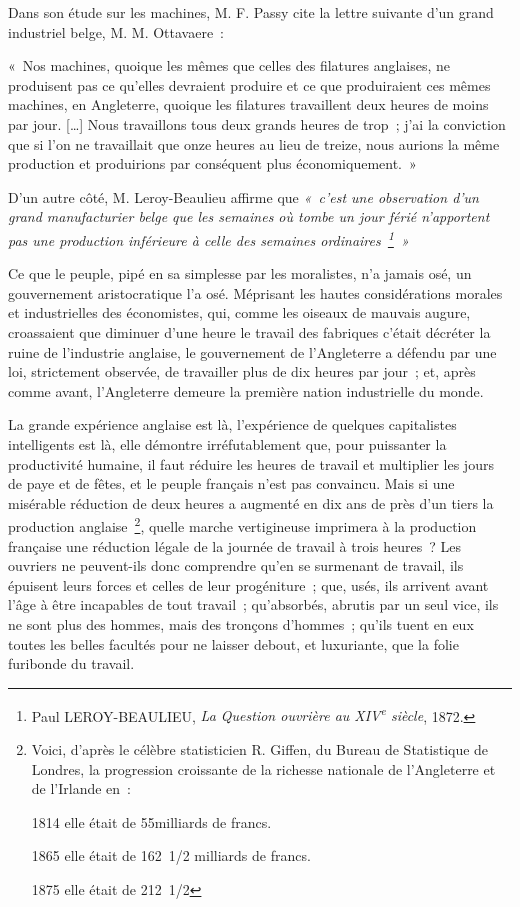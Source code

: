 \documentclass[french,twoside]{book} %
\newenvironment{quoteblock}%
  {\begin{quoting}}
  {\end{quoting}}
\newenvironment{quotebar}{%
    \def\FrameCommand{{\color{rubric!10!}\vrule width 0.5em} \hspace{0.9em}}%
    \def\OuterFrameSep{\itemsep} %
    \MakeFramed {\advance\hsize-\width \FrameRestore}
  }%
  {%
    \endMakeFramed
  }
\renewenvironment{quoteblock}%
  {%
    \savenotes
    \setstretch{0.9}
    \normalfont
    \begin{quotebar}
  }
  {%
    \end{quotebar}
    \spewnotes
  }
\begin{document}
\noindent Dans son étude sur les machines, M. F. Passy cite la lettre suivante d’un grand industriel belge, M. M. Ottavaere :\par

\begin{quoteblock}
 \noindent « Nos machines, quoique les mêmes que celles des filatures anglaises, ne produisent pas ce qu’elles devraient produire et ce que produiraient ces mêmes machines, en Angleterre, quoique les filatures travaillent deux heures de moins par jour. […] Nous travaillons tous deux grands heures de trop ; j’ai la conviction que si l’on ne travaillait que onze heures au lieu de treize, nous aurions la même production et produirions par conséquent plus économiquement. »
\end{quoteblock}

\noindent D’un autre côté, M. Leroy-Beaulieu affirme que \emph{« c’est une observation d’un grand manufacturier belge que les semaines où tombe un jour férié n’apportent pas une production inférieure à celle des semaines ordinaires \footnote{Paul LEROY-BEAULIEU, \emph{La Question ouvrière au XIV\textsuperscript{e} siècle}, 1872.} »}\par
Ce que le peuple, pipé en sa simplesse par les moralistes, n’a jamais osé, un gouvernement aristocratique l’a osé. Méprisant les hautes considérations morales et industrielles des économistes, qui, comme les oiseaux de mauvais augure, croassaient que diminuer d’une heure le travail des fabriques c’était décréter la ruine de l’industrie anglaise, le gouvernement de l’Angleterre a défendu par une loi, strictement observée, de travailler plus de dix heures par jour ; et, après comme avant, l’Angleterre demeure la première nation industrielle du monde.\par
La grande expérience anglaise est là, l’expérience de quelques capitalistes intelligents est là, elle démontre irréfutablement que, pour puissanter la productivité humaine, il faut réduire les heures de travail et multiplier les jours de paye et de fêtes, et le peuple français n’est pas convaincu. Mais si une misérable réduction de deux heures a augmenté en dix ans de près d’un tiers la production anglaise \footnote{ \noindent Voici, d’après le célèbre statisticien R. Giffen, du Bureau de Statistique de Londres, la progression croissante de la richesse nationale de l’Angleterre et de l’Irlande en :\par
 1814 elle était de 55milliards de francs.\par
 1865 elle était de 162 1/2 milliards de francs.\par
 1875 elle était de 212 1/2
}, quelle marche vertigineuse imprimera à la production française une réduction légale de la journée de travail à trois heures ? Les ouvriers ne peuvent-ils donc comprendre qu’en se surmenant de travail, ils épuisent leurs forces et celles de leur progéniture ; que, usés, ils arrivent avant l’âge à être incapables de tout travail ; qu’absorbés, abrutis par un seul vice, ils ne sont plus des hommes, mais des tronçons d’hommes ; qu’ils tuent en eux toutes les belles facultés pour ne laisser debout, et luxuriante, que la folie furibonde du travail.\par
\end{document}
